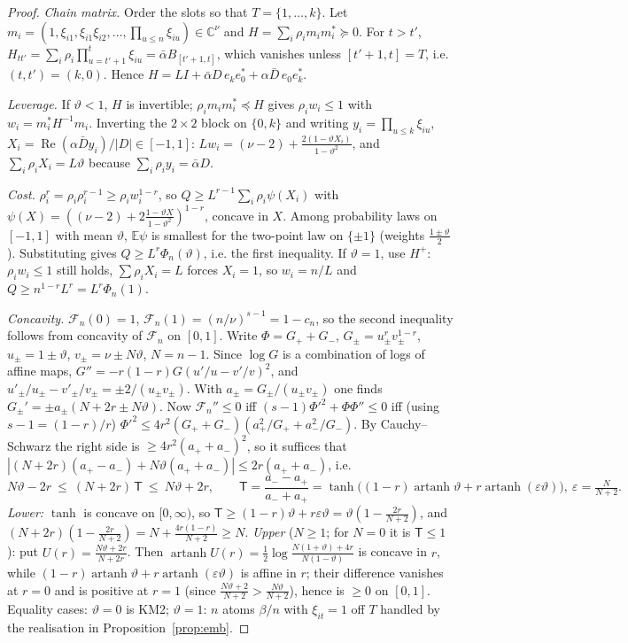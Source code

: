 \documentclass[11pt]{article}
\theoremstyle{remark}
\renewcommand{\Re}{\operatorname{Re}}
\begin{document}
\begin{proof}
\emph{Chain matrix.} Order the slots so that $T=\{1,\dots,k\}$. Let $m_i=(1,\xi_{i1},\xi_{i1}\xi_{i2},\dots,\prod_{u\le n}\xi_{iu})\in\mathbb C^\nu$ and
$H=\sum_i\rho_im_im_i^*\succeq0$. For $t>t'$, $H_{tt'}=\sum_i\rho_i\prod_{u=t'+1}^t\xi_{iu}=\bar\alpha B_{[t'+1,t]}$, which vanishes unless
$[t'+1,t]=T$, i.e. $(t,t')=(k,0)$. Hence $H=LI+\bar\alpha D\,e_ke_0^*+\alpha\bar D\,e_0e_k^*$.

\emph{Leverage.} If $\vartheta<1$, $H$ is invertible; $\rho_im_im_i^*\preceq H$ gives $\rho_iw_i\le1$ with $w_i=m_i^*H^{-1}m_i$. Inverting the
$2\times2$ block on $\{0,k\}$ and writing $y_i=\prod_{u\le k}\xi_{iu}$, $X_i=\Re(\alpha\bar Dy_i)/|D|\in[-1,1]$:
$Lw_i=(\nu-2)+\frac{2(1-\vartheta X_i)}{1-\vartheta^2}$, and $\sum_i\rho_iX_i=L\vartheta$ because $\sum_i\rho_iy_i=\bar\alpha D$.

\emph{Cost.} $\rho_i^r=\rho_i\rho_i^{r-1}\ge\rho_iw_i^{1-r}$, so $Q\ge L^{r-1}\sum_i\rho_i\psi(X_i)$ with $\psi(X)=((\nu-2)+2\frac{1-\vartheta X}{1-\vartheta^2})^{1-r}$,
concave in $X$. Among probability laws on $[-1,1]$ with mean $\vartheta$, $\mathbb E\psi$ is smallest for the two-point law on $\{\pm1\}$
(weights $\frac{1\pm\vartheta}2$). Substituting gives $Q\ge L^r\Phi_n(\vartheta)$, i.e. the first inequality.
If $\vartheta=1$, use $H^+$: $\rho_iw_i\le1$ still holds, $\sum\rho_iX_i=L$ forces $X_i=1$, so $w_i=n/L$ and $Q\ge n^{1-r}L^r=L^r\Phi_n(1)$.

\emph{Concavity.} $\mathcal F_n(0)=1$, $\mathcal F_n(1)=(n/\nu)^{s-1}=1-c_n$, so the second inequality follows from concavity of $\mathcal F_n$ on $[0,1]$.
Write $\Phi=G_++G_-$, $G_\pm=u_\pm^rv_\pm^{1-r}$, $u_\pm=1\pm\vartheta$, $v_\pm=\nu\pm N\vartheta$, $N=n-1$. Since $\log G$ is a combination of
logs of affine maps, $G''=-r(1-r)G(u'/u-v'/v)^2$, and $u'_\pm/u_\pm-v'_\pm/v_\pm=\pm2/(u_\pm v_\pm)$. With $a_\pm=G_\pm/(u_\pm v_\pm)$ one finds
$G_\pm'=\pm a_\pm(N+2r\pm N\vartheta)$. Now $\mathcal F_n''\le0$ iff $(s-1)\Phi'^2+\Phi\Phi''\le0$ iff (using $s-1=(1-r)/r$)
$\Phi'^2\le4r^2(G_++G_-)(a_+^2/G_++a_-^2/G_-)$. By Cauchy--Schwarz the right side is $\ge4r^2(a_++a_-)^2$, so it suffices that
$|(N+2r)(a_+-a_-)+N\vartheta(a_++a_-)|\le2r(a_++a_-)$, i.e.
\[
N\vartheta-2r\ \le\ (N+2r)\,\mathsf T\ \le\ N\vartheta+2r,\qquad \mathsf T=\frac{a_--a_+}{a_-+a_+}=\tanh\big((1-r)\operatorname{artanh}\vartheta+r\operatorname{artanh}(\varepsilon\vartheta)\big),
\ \varepsilon=\tfrac N{N+2}.
\]
\emph{Lower:} $\tanh$ is concave on $[0,\infty)$, so $\mathsf T\ge(1-r)\vartheta+r\varepsilon\vartheta=\vartheta(1-\frac{2r}{N+2})$, and
$(N+2r)(1-\frac{2r}{N+2})=N+\frac{4r(1-r)}{N+2}\ge N$.
\emph{Upper} ($N\ge1$; for $N=0$ it is $\mathsf T\le1$): put $U(r)=\frac{N\vartheta+2r}{N+2r}$. Then
$\operatorname{artanh}U(r)=\frac12\log\frac{N(1+\vartheta)+4r}{N(1-\vartheta)}$ is concave in $r$, while $(1-r)\operatorname{artanh}\vartheta+r\operatorname{artanh}(\varepsilon\vartheta)$ is affine in $r$;
their difference vanishes at $r=0$ and is positive at $r=1$ (since $\frac{N\vartheta+2}{N+2}>\frac{N\vartheta}{N+2}$), hence is $\ge0$ on $[0,1]$.
Equality cases: $\vartheta=0$ is KM2; $\vartheta=1$: $n$ atoms $\beta/n$ with $\xi_{it}=1$ off $T$ handled by the realisation in
Proposition~\ref{prop:emb}.
\end{proof}
\end{document}
